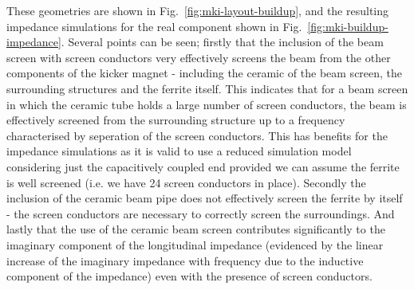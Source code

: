 These geometries are shown in Fig.~\ref{fig:mki-layout-buildup}, and the resulting impedance simulations for the real component shown in Fig.~\ref{fig:mki-buildup-impedance}. Several points can be seen; firstly that the inclusion of the beam screen with screen conductors very effectively screens the beam from the other components of the kicker magnet - including the ceramic of the beam screen, the surrounding structures and the ferrite itself. This indicates that for a beam screen in which the ceramic tube holds a large number of screen conductors, the beam is effectively screened from the surrounding structure up to a frequency characterised by seperation of the screen conductors. This has benefits for the impedance simulations as it is valid to use a reduced simulation model considering just the capacitively coupled end provided we can assume the ferrite is well screened (i.e. we have 24 screen conductors in place). Secondly the inclusion of the ceramic beam pipe does not effectively screen the ferrite by itself - the screen conductors are necessary to correctly screen the surroundings. And lastly that the use of the ceramic beam screen contributes significantly to the imaginary component of the longitudinal impedance (evidenced by the linear increase of the imaginary impedance with frequency due to the inductive component of the impedance) even with the presence of screen conductors.
 
